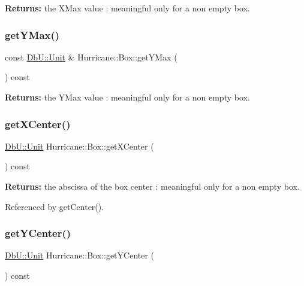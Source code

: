 {\bfseries Returns\+:} the X\+Max value \+: meaningful only for a non empty box. \mbox{\label{classHurricane_1_1Box_a06e1a86a06dacfca6d3403c16affc7e8}} 
\subsubsection{\texorpdfstring{get\+Y\+Max()}{getYMax()}}
{\footnotesize\ttfamily const \hyperlink{group__DbUGroup_ga4fbfa3e8c89347af76c9628ea06c4146}{Db\+U\+::\+Unit} \& Hurricane\+::\+Box\+::get\+Y\+Max (\begin{DoxyParamCaption}{ }\end{DoxyParamCaption}) const\hspace{0.3cm}{\ttfamily [inline]}}

{\bfseries Returns\+:} the Y\+Max value \+: meaningful only for a non empty box. \mbox{\label{classHurricane_1_1Box_a95f35cd33966aad61bb43662306ccf98}} 
\subsubsection{\texorpdfstring{get\+X\+Center()}{getXCenter()}}
{\footnotesize\ttfamily \hyperlink{group__DbUGroup_ga4fbfa3e8c89347af76c9628ea06c4146}{Db\+U\+::\+Unit} Hurricane\+::\+Box\+::get\+X\+Center (\begin{DoxyParamCaption}{ }\end{DoxyParamCaption}) const\hspace{0.3cm}{\ttfamily [inline]}}

{\bfseries Returns\+:} the abscissa of the box center \+: meaningful only for a non empty box. 

Referenced by get\+Center().

\mbox{\label{classHurricane_1_1Box_a659820726e3862a70158b6f5b7644da0}} 
\subsubsection{\texorpdfstring{get\+Y\+Center()}{getYCenter()}}
{\footnotesize\ttfamily \hyperlink{group__DbUGroup_ga4fbfa3e8c89347af76c9628ea06c4146}{Db\+U\+::\+Unit} Hurricane\+::\+Box\+::get\+Y\+Center (\begin{DoxyParamCaption}{ }\end{DoxyParamCaption}) const\hspace{0.3cm}{\ttfamily [inline]}}

